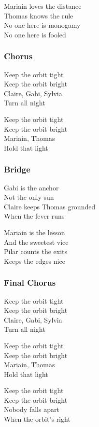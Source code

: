 Mariain loves the distance\\
Thomas knows the rule\\
No one here is monogamy\\
No one here is fooled

\subsubsection{Chorus}\label{chorus-33}

Keep the orbit tight\\
Keep the orbit bright\\
Claire, Gabi, Sylvia\\
Turn all night

Keep the orbit tight\\
Keep the orbit bright\\
Mariain, Thomas\\
Hold that light

\subsubsection{Bridge}\label{bridge-10}

Gabi is the anchor\\
Not the only sun\\
Claire keeps Thomas grounded\\
When the fever runs

Mariain is the lesson\\
And the sweetest vice\\
Pilar counts the exits\\
Keeps the edges nice

\subsubsection{Final Chorus}\label{final-chorus-2}

Keep the orbit tight\\
Keep the orbit bright\\
Claire, Gabi, Sylvia\\
Turn all night

Keep the orbit tight\\
Keep the orbit bright\\
Mariain, Thomas\\
Hold that light

Keep the orbit tight\\
Keep the orbit bright\\
Nobody falls apart\\
When the orbit's right

